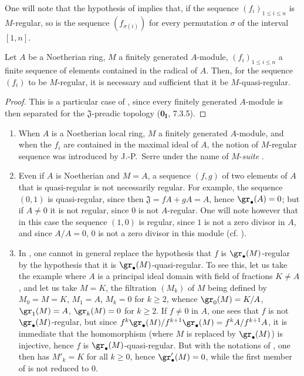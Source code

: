 One will note that the hypothesis of  implies that, if the sequence $(f_i)_{1\leq i\leq n}$ is $M$-regular, so is the sequence $(f_{\sigma(i)})$ for every permutation $\sigma$ of the interval $[1,n]$.

\begin{corollary}[15.1.11]
\label{0.15.1.11}
Let $A$ be a Noetherian ring, $M$ a finitely generated $A$-module, $(f_i)_{1\leq i\leq n}$ a finite sequence of elements contained in the radical of $A$.
Then, for the sequence $(f_i)$ to be $M$-regular, it is necessary and sufficient that it be $M$-quasi-regular.
\end{corollary}

\begin{proof}
This is a particular case of , since every finitely generated $A$-module is then separated for the $\mathfrak{J}$-preadic topology ($\mathbf{0_I}$, 7.3.5).
\end{proof}

\begin{remarks}[15.1.12]
\label{0.15.1.12}
\mbox{}
\begin{enumerate}
  \item[(i)] When $A$ is a Noetherian local ring, $M$ a finitely generated $A$-module, and when the $f_i$ are contained in the maximal ideal of $A$, the notion of $M$-regular sequence was introduced by J.-P.~Serre under the name of $M$-\emph{suite} \cite{I-17}.
  \item[(ii)] Even if $A$ is Noetherian and $M=A$, a sequence $(f,g)$ of two elements of $A$ that is quasi-regular is not necessarily regular.
  For example, the sequence $(0,1)$ is quasi-regular, since then $\mathfrak{J}=fA+gA=A$, hence $\gr_\bullet(A)=0$;
  but if $A\neq 0$ it is not regular, since $0$ is not $A$-regular.
  One will note however that in this case the sequence $(1,0)$ is regular, since $1$ is not a zero divisor in $A$, and since $A/A=0$, $0$ is not a zero divisor in this module (cf. ).
  \item[(iii)]
  In , one cannot in general replace the hypothesis that $f$ is $\gr_\bullet(M)$-regular by the hypothesis that it is $\gr_\bullet(M)$-quasi-regular.
  To see this, let us take the example  where $A$ is a principal ideal domain with field of fractions $K\neq A$, and let us take $M=K$, the filtration $(M_k)$ of $M$ being defined by $M_0=M=K$, $M_1=A$, $M_k=0$ for $k\geq 2$, whence $\gr_0(M)=K/A$, $\gr_1(M)=A$, $\gr_k(M)=0$ for $k\geq 2$.
  If $f\neq 0$ in $A$, one sees that $f$ is not $\gr_\bullet(M)$-regular, but since $f^k\gr_\bullet(M)/f^{k+1}\gr_\bullet(M)=f^kA/f^{k+1}A$, it is immediate that the homomorphism  (where $M$ is replaced by $\gr_\bullet(M)$) is injective, hence $f$ is $\gr_\bullet(M)$-quasi-regular.
  But with the notations of , one then has $M'_k=K$ for all $k\geq 0$, hence $\gr'_\bullet(M)=0$, while the first member of  is not reduced to $0$.
\end{enumerate}
\end{remarks}

